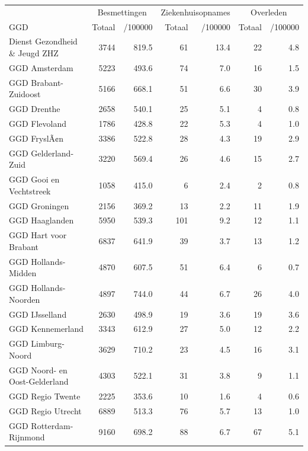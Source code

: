 \documentclass[
  english,
  man,floatsintext]{apa6}
\begin{document}
\begin{table}
\centering\begingroup\fontsize{10}{12}\selectfont

\begin{threeparttable}
\begin{tabular}{lrrrrrr}
\toprule
\multicolumn{1}{c}{ } & \multicolumn{2}{c}{Besmettingen} & \multicolumn{2}{c}{Ziekenhuisopnames} & \multicolumn{2}{c}{Overleden} \\
\cmidrule(l{3pt}r{3pt}){2-3} \cmidrule(l{3pt}r{3pt}){4-5} \cmidrule(l{3pt}r{3pt}){6-7}
GGD & Totaal & /100000 & Totaal & /100000 & Totaal & /100000\\
\midrule
Dienst Gezondheid \& Jeugd ZHZ & 3744 & 819.5 & 61 & 13.4 & 22 & 4.8\\
GGD Amsterdam & 5223 & 493.6 & 74 & 7.0 & 16 & 1.5\\
GGD Brabant-Zuidoost & 5166 & 668.1 & 51 & 6.6 & 30 & 3.9\\
GGD Drenthe & 2658 & 540.1 & 25 & 5.1 & 4 & 0.8\\
GGD Flevoland & 1786 & 428.8 & 22 & 5.3 & 4 & 1.0\\
GGD FryslÃ¢n & 3386 & 522.8 & 28 & 4.3 & 19 & 2.9\\
GGD Gelderland-Zuid & 3220 & 569.4 & 26 & 4.6 & 15 & 2.7\\
GGD Gooi en Vechtstreek & 1058 & 415.0 & 6 & 2.4 & 2 & 0.8\\
GGD Groningen & 2156 & 369.2 & 13 & 2.2 & 11 & 1.9\\
GGD Haaglanden & 5950 & 539.3 & 101 & 9.2 & 12 & 1.1\\
GGD Hart voor Brabant & 6837 & 641.9 & 39 & 3.7 & 13 & 1.2\\
GGD Hollands-Midden & 4870 & 607.5 & 51 & 6.4 & 6 & 0.7\\
GGD Hollands-Noorden & 4897 & 744.0 & 44 & 6.7 & 26 & 4.0\\
GGD IJsselland & 2630 & 498.9 & 19 & 3.6 & 19 & 3.6\\
GGD Kennemerland & 3343 & 612.9 & 27 & 5.0 & 12 & 2.2\\
GGD Limburg-Noord & 3629 & 710.2 & 23 & 4.5 & 16 & 3.1\\
GGD Noord- en Oost-Gelderland & 4303 & 522.1 & 31 & 3.8 & 9 & 1.1\\
GGD Regio Twente & 2225 & 353.6 & 10 & 1.6 & 4 & 0.6\\
GGD Regio Utrecht & 6889 & 513.3 & 76 & 5.7 & 13 & 1.0\\
GGD Rotterdam-Rijnmond & 9160 & 698.2 & 88 & 6.7 & 67 & 5.1\\

\end{tabular}
\end{threeparttable}
\end{table}
\end{document}
